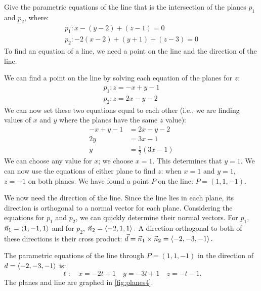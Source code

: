 \begin{example}\label{ex_planes4}%
Give the parametric equations of the line that is the intersection of the planes $p_1$ and $p_2$, where:
\begin{gather*}
p_1: x-(y-2)+(z-1) =0 \\
p_2: -2(x-2)+(y+1)+(z-3)=0
\end{gather*}
\solution
To find an equation of a line, we need a point on the line and the direction of the line. 

We can find a point on the line by solving each equation of the planes for $z$:
\begin{gather*}
p_1: z = -x+y-1 \\
p_2: z = 2x-y-2
\end{gather*}
We can now set these two equations equal to each other (i.e., we are finding values of $x$ and $y$ where the planes have the same $z$ value):
\begin{align*}
-x+y-1 &= 2x-y-2 \\
2y &= 3x-1\\
y &= \frac12(3x-1)
\end{align*}
We can choose any value for $x$; we choose $x=1$. This determines that $y=1$. We can now use the equations of either plane to find $z$: when $x=1$ and $y=1$, $z=-1$ on both planes. We have found a point $P$  on the line: $P= (1,1,-1)$. 

We now need the direction of the line. Since the line lies in each plane, its direction is orthogonal to a normal vector for each plane. Considering the equations for $p_1$ and $p_2$, we can quickly determine their normal vectors. For $p_1$, $\vec n_1 =\left\langle 1,-1,1\right\rangle$ and for $p_2$, $\vec n_2 =\left\langle -2,1,1\right\rangle.$ A direction orthogonal to both of these directions is their cross product: $\vec d = \vec n_1\times \vec n_2 =\left\langle -2,-3,-1\right\rangle.$


The parametric equations of the line through $P=(1,1,-1)$ in the direction of $d=\left\langle -2,-3,-1\right\rangle$ is:
\[\ell: \quad x= -2t+1\quad y = -3t+1\quad z=-t-1.\]
The planes and line are graphed in \autoref{fig:planes4}.
\end{example}

